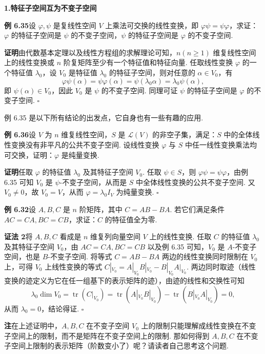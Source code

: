 \documentclass[UTF8,12pt,a4paper,fontset=fandol]{ctexart}
\begin{document}
\noindent\textbf{1.\quad 特征子空间互为不变子空间}

\noindent\textbf{例 6.35}\quad 设 $\varphi,\psi$ 是复线性空间 $V$ 上乘法可交换的线性变换，即 $\varphi\psi=\psi\varphi$，求证：$\varphi$ 的特征子空间是 $\psi$ 的不变子空间，$\psi$ 的特征子空间是 $\varphi$ 的不变子空间.

\noindent\textbf{证明}\quad 由代数基本定理以及线性方程组的求解理论可知，$n(n\ge 1)$ 维复线性空间上的线性变换或 $n$ 阶复矩阵至少有一个特征值和特征向量. 任取线性变换 $\varphi$ 的一个特征值 $\lambda_0$，设 $V_0$ 是特征值 $\lambda_0$ 的特征子空间，则对任意的 $\alpha\in V_0$，有
\[
\varphi\psi(\alpha)=\psi\varphi(\alpha)=\psi(\lambda_0\alpha)=\lambda_0\psi(\alpha),
\]
即 $\psi(\alpha)\in V_0$，因此 $V_0$ 是 $\psi$ 的不变子空间. 同理可证 $\psi$ 的特征子空间是 $\varphi$ 的不变子空间. $\square$

例 6.35 是以下所有结论的出发点，它自身也有一些有趣的应用.

\noindent\textbf{例 6.36}\quad 设 $V$ 为 $n$ 维复线性空间，$S$ 是 $\mathcal{L}(V)$ 的非空子集，满足：$S$ 中的全体线性变换没有非平凡的公共不变子空间. 设线性变换 $\varphi$ 与 $S$ 中任一线性变换乘法均可交换，证明：$\varphi$ 是纯量变换.

\noindent\textbf{证明}\quad 任取 $\varphi$ 的特征值 $\lambda_0$ 及其特征子空间 $V_0$. 任取 $\psi\in S$，则 $\varphi\psi=\psi\varphi$，由例 6.35 可知 $V_0$ 是 $\psi$-不变子空间，从而是 $S$ 中全体线性变换的公共不变子空间. 又 $V_0\ne 0$，故 $V_0=V$，从而 $\varphi=\lambda_0I_V$ 为纯量变换. $\square$

\noindent\textbf{例 6.32}\quad 设 $A,B,C$ 是 $n$ 阶矩阵，其中 $C=AB-BA$. 若它们满足条件 $AC=CA,BC=CB$，求证：$C$ 的特征值全为零.

\noindent\textbf{证法 2}\quad 将 $A,B,C$ 看成是 $n$ 维复列向量空间 $V$ 上的线性变换. 任取 $C$ 的特征值 $\lambda_0$ 及其特征子空间 $V_0$，由 $AC=CA,BC=CB$ 以及例 6.35 可知，$V_0$ 是 $A$-不变子空间，也是 $B$-不变子空间. 将等式 $C=AB-BA$ 两边的线性变换同时限制在 $V_0$ 上，可得 $V_0$ 上线性变换的等式 $C|_{V_0}=A|_{V_0}B|_{V_0}-B|_{V_0}A|_{V_0}$. 两边同时取迹（线性变换的迹定义为它在任一组基下的表示矩阵的迹），由迹的线性和交换性可知
\[
\lambda_0\dim V_0=\operatorname{tr}(C|_{V_0})
=\operatorname{tr}(A|_{V_0}B|_{V_0})-\operatorname{tr}(B|_{V_0}A|_{V_0})=0,
\]
从而 $\lambda_0=0$，结论得证. $\square$

\noindent\textbf{注}\quad 在上述证明中，$A,B,C$ 在不变子空间 $V_0$ 上的限制只能理解成线性变换在不变子空间上的限制，而不是矩阵在不变子空间上的限制. 那如何得到 $A,B,C$ 在不变子空间上限制的表示矩阵（阶数变小了）呢？请读者自己思考这个问题.
\end{document}
